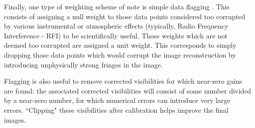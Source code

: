 \pg
Finally, one type of weighting scheme of note is simple data flagging . This consists of assigning a null weight to those data points considered too corrupted by various instrumental or atmospheric effects (typically, Radio Frequency Interference - RFI) to be scientifically useful. Those weights which are not deemed too corrupted are assigned a unit weight. This corresponds to simply dropping those data points which would corrupt the image reconstruction by introducing unphysically strong fringes in the image.

\pg
Flagging is also useful to remove corrected visibilities for which near-zero gains are found: the associated corrected visibilities will consist of some number divided by a near-zero number, for which numerical errors can introduce very large errors. ``Clipping" these visibilities after calibration helps improve the final images.
